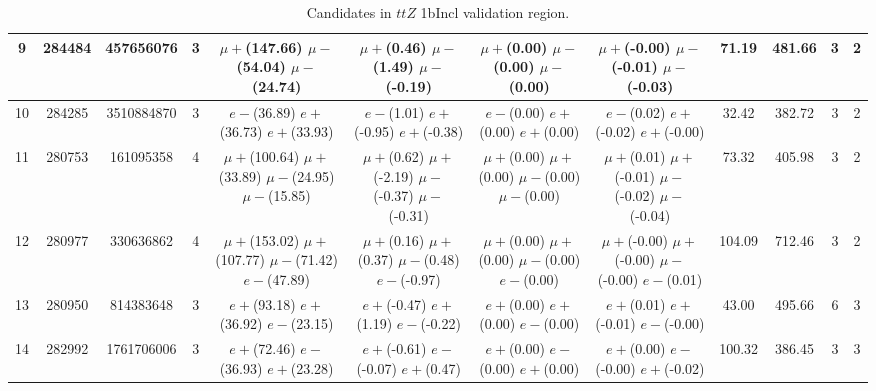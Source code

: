 \begin{sidewaystable}[ph!]
{{\begin{tabular}{|c|c|c|c|c|c|c|c|c|c|c|c|}
9  & 284484 & 457656076 & 3 & $\mu+$(147.66) $\mu-$(54.04) $\mu-$(24.74) & $\mu+$(0.46) $\mu-$(1.49) $\mu-$(-0.19) & $\mu+$(0.00) $\mu-$(0.00) $\mu-$(0.00) & $\mu+$(-0.00) $\mu-$(-0.01) $\mu-$(-0.03) & 71.19 & 481.66 & 3 & 2 \\ \hline
10  & 284285 & 3510884870 & 3 & $e-$(36.89) $e+$(36.73) $e+$(33.93) & $e-$(1.01) $e+$(-0.95) $e+$(-0.38) & $e-$(0.00) $e+$(0.00) $e+$(0.00) & $e-$(0.02) $e+$(-0.02) $e+$(-0.00) & 32.42 & 382.72 & 3 & 2 \\ \hline
11   & 280753 & 161095358 & 4 & $\mu+$(100.64) $\mu+$(33.89) $\mu-$(24.95) $\mu-$(15.85) & $\mu+$(0.62) $\mu+$(-2.19) $\mu-$(-0.37) $\mu-$(-0.31) & $\mu+$(0.00) $\mu+$(0.00) $\mu-$(0.00)  $\mu-$(0.00) & $\mu+$(0.01) $\mu+$(-0.01) $\mu-$(-0.02) $\mu-$(-0.04) & 73.32 & 405.98 & 3 & 2 \\ \hline
12   & 280977 & 330636862 & 4 & $\mu+$(153.02) $\mu+$(107.77) $\mu-$(71.42) $e-$(47.89) & $\mu+$(0.16) $\mu+$(0.37) $\mu-$(0.48) $e-$(-0.97) & $\mu+$(0.00) $\mu+$(0.00) $\mu-$(0.00)  $e-$(0.00) & $\mu+$(-0.00) $\mu+$(-0.00) $\mu-$(-0.00) $e-$(0.01) & 104.09 & 712.46 & 3 & 2 \\ \hline \hline
13  & 280950 & 814383648 & 3 & $e+$(93.18) $e+$(36.92) $e-$(23.15) & $e+$(-0.47) $e+$(1.19) $e-$(-0.22) & $e+$(0.00) $e+$(0.00) $e-$(0.00) & $e+$(0.01) $e+$(-0.01) $e-$(-0.00) & 43.00 & 495.66 & 6 & 3 \\ \hline
14  & 282992 & 1761706006 & 3 & $e+$(72.46) $e-$(36.93) $e+$(23.28) & $e+$(-0.61) $e-$(-0.07) $e+$(0.47) & $e+$(0.00) $e-$(0.00) $e+$(0.00) & $e+$(0.00) $e-$(-0.00) $e+$(-0.02) & 100.32 & 386.45 & 3 & 3 \\ \hline
\end{tabular}}
\caption{Candidates in $ttZ$ 1bIncl validation region.}
\label{table:Candidates_ttZ}
}


\end{sidewaystable}
